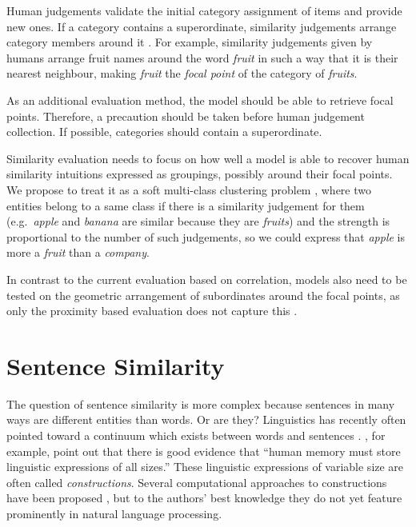 \documentclass[11pt]{article}
\begin{document}
Human judgements validate the initial category assignment of items and provide new ones. If a category contains a superordinate, similarity judgements arrange category members around it \cite{1986-13502-00119860101}. For example, similarity judgements given by humans arrange fruit names around the word \textit{fruit} in such a way that it is their nearest neighbour, making \textit{fruit} the \emph{focal point} of the category of \textit{fruits}.

As an additional evaluation method, the model should be able to retrieve focal points. Therefore, a precaution should be taken before human judgement collection. If possible, categories should contain a superordinate.

Similarity evaluation needs to focus on how well a model is able to recover human similarity intuitions expressed as groupings, possibly around their focal points. We propose to treat it as a soft multi-class clustering problem \cite{White:2015:WSE:2838931.2838932}, where two entities belong to a same class if there is a similarity judgement for them (e.g.~\textit{apple} and \textit{banana} are similar because they are \textit{fruits}) and the strength is proportional to the number of such judgements, so we could express that \textit{apple} is more a \textit{fruit} than a \textit{company}.

In contrast to the current evaluation based on correlation, models also need to be tested on the geometric arrangement of subordinates around the focal points, as only the proximity based evaluation does not capture this \cite{1986-13502-00119860101}.

\section{Sentence Similarity}

The question of sentence similarity is more complex because sentences in many ways are different entities than words. Or are they? Linguistics has recently often pointed toward a continuum which exists between words and sentences \cite{jackendoff2012cambridge}. , for example, point out that there is good evidence that ``human memory must store linguistic expressions of all sizes.'' These linguistic expressions of variable size are often called \emph{constructions}. Several computational approaches to constructions have been proposed \cite{Gaspers2011,chang2012computational}, but to the authors' best knowledge they do not yet feature prominently in natural language processing.
\end{document}
